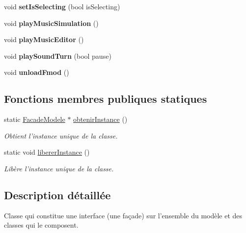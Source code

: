 \begin{DoxyCompactItemize}
\item 
\hypertarget{class_facade_modele_ac18f70935da2e847993eaecd381fd2f1}{void {\bfseries set\-Is\-Selecting} (bool is\-Selecting)}\label{class_facade_modele_ac18f70935da2e847993eaecd381fd2f1}

\item 
\hypertarget{group__inf2990_ga98a0ea63d3251c1ca9d83dddd76cab58}{void {\bfseries play\-Music\-Simulation} ()}\label{group__inf2990_ga98a0ea63d3251c1ca9d83dddd76cab58}

\item 
\hypertarget{group__inf2990_ga91b21156f39935cd430bc95573af141e}{void {\bfseries play\-Music\-Editor} ()}\label{group__inf2990_ga91b21156f39935cd430bc95573af141e}

\item 
\hypertarget{group__inf2990_gad683ea4f3c133637035b888be80548fe}{void {\bfseries play\-Sound\-Turn} (bool pause)}\label{group__inf2990_gad683ea4f3c133637035b888be80548fe}

\item 
\hypertarget{group__inf2990_ga1df1b267321f9b5bc811f650509a83e2}{void {\bfseries unload\-Fmod} ()}\label{group__inf2990_ga1df1b267321f9b5bc811f650509a83e2}

\end{DoxyCompactItemize}
\subsection*{Fonctions membres publiques statiques}
\begin{DoxyCompactItemize}
\item 
static \hyperlink{class_facade_modele}{Facade\-Modele} $\ast$ \hyperlink{group__inf2990_ga63593b81c6f3cc2251e2b61d9e8fc670}{obtenir\-Instance} ()
\begin{DoxyCompactList}\small\item\em Obtient l'instance unique de la classe. \end{DoxyCompactList}\item 
static void \hyperlink{group__inf2990_gacbf0495fda26f5be37089470dc5f4372}{liberer\-Instance} ()
\begin{DoxyCompactList}\small\item\em Libère l'instance unique de la classe. \end{DoxyCompactList}\end{DoxyCompactItemize}


\subsection{Description détaillée}
Classe qui constitue une interface (une façade) sur l'ensemble du modèle et des classes qui le composent. 

